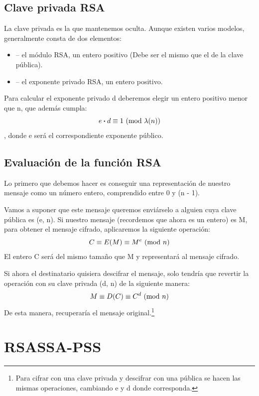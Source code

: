\subsection{Clave privada RSA}

La clave privada es la que mantenemos oculta. Aunque existen varios modelos, generalmente consta de dos elementos:
\begin{itemize}
  \item {} -- el módulo RSA, un entero positivo (Debe ser el mismo que el de la clave pública).
  \item {} -- el exponente privado RSA, un entero positivo.
\end{itemize}

Para calcular el exponente privado d deberemos elegir un entero positivo menor que n, que además cumpla:
\[ e \boldsymbol{\cdot} d \equiv 1 \ (\mathrm{mod}\ \lambda(n)) \]
, donde e será el correspondiente exponente público. \emph{\parencite{Reference11}}

\subsection{Evaluación de la función RSA}

Lo primero que debemos hacer es conseguir una representación de nuestro mensaje como un número entero, comprendido entre 0 y (n - 1).

Vamos a suponer que este mensaje queremos enviárselo a alguien cuya clave pública es (e, n). Si nuestro mensaje (recordemos que ahora es un entero) es M, para obtener el mensaje cifrado, aplicaremos la siguiente operación:
\[ C \equiv E(M) \equiv M^e \ (\mathrm{mod}\ n) \]
El entero C será del mismo tamaño que M y representará al mensaje cifrado.

Si ahora el destinatario quisiera descifrar el mensaje, solo tendría que revertir la operación con su clave privada (d, n) de la siguiente manera:
\[ M \equiv D(C) \equiv C^d \ (\mathrm{mod}\ n) \]
De esta manera, recuperaría el mensaje original.\footnote{Para cifrar con una clave privada y descifrar con una pública se hacen las mismas operaciones, cambiando e y d donde corresponda.} \emph{\parencite{Reference12}}


\section{RSASSA-PSS}

